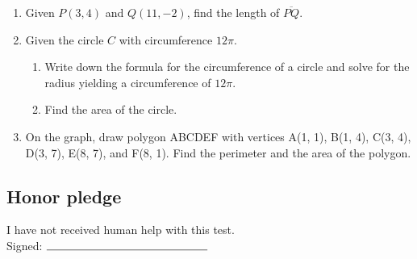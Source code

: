 \documentclass[12pt, twoside]{article}
\begin{document}
\begin{enumerate}
  \item Given $P(3,4)$ and $Q(11,-2)$, find the length of $\overline{PQ}$.
      \vspace{6cm}

  \item Given the circle $C$ with circumference $12\pi$.
  \begin{enumerate}
    \item Write down the formula for the circumference of a circle and solve for the radius yielding a circumference of $12\pi$. \vspace{1cm}
    \item Find the area of the circle.
  \end{enumerate}

  \item On the graph, draw polygon ABCDEF with vertices A(1, 1), B(1, 4), C(3, 4), D(3, 7), E(8, 7), and F(8, 1). Find the perimeter and the area of the polygon.\\[1cm]
  \vspace{2cm}

  \end{enumerate}

  \subsection*{Honor pledge}
  I have not received human help with this test. \\[0.5cm]
  Signed: \hspace{0.4cm} $\rule{5cm}{0.15mm}$
\end{document}
